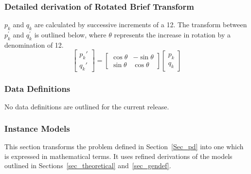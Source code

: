 \documentclass[12pt]{article}
\begin{document}
\subsubsection*{Detailed derivation of Rotated Brief Transform}
$\mathit{p_{k}}$ and $\mathit{q_{k}}$ are calculated by successive increments of a 12\textdegree. 
The transform between $\mathit{p_{k}^{'}}$ and $\mathit{q_{k}^{'}}$ is outlined below, where $\theta$ 
represents the increase in rotation by a denomination of 12\textdegree. \\

\[
\begin{bmatrix} p_k' \\ q_k' \end{bmatrix} =
\begin{bmatrix} \cos\theta & -\sin\theta \\ \sin\theta & \cos\theta \end{bmatrix}
\begin{bmatrix} p_k \\ q_k \end{bmatrix}
\]

\subsubsection{Data Definitions}\label{sec_datadef}
No data definitions are outlined for the current release.

\subsubsection{Instance Models} \label{sec_instance}    
This section transforms the problem defined in Section~\ref{Sec_pd} into 
one which is expressed in mathematical terms. It uses refined derivations of the 
models outlined in Sections~\ref{sec_theoretical} and~\ref{sec_gendef}.

~\newline
\end{document}
